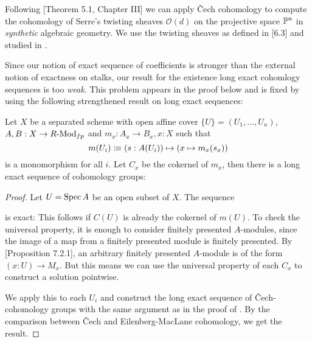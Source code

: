 
Following \cite{Hartshorne}[Theorem 5.1, Chapter III] we can apply \v{C}ech cohomology to compute
the cohomology of Serre's twisting sheaves $\mathcal O(d)$ on the projective space $\mathbb{P}^n$ in \emph{synthetic} algebraic geometry.
We use the twisting sheaves as defined in \cite{draft}[6.3] and studied in \cite{sag-projective}.

Since our notion of exact sequence of coefficients is stronger than the external notion of exactness on stalks, our result for the existence long exact cohomlogy sequences is too \emph{weak}.
This problem appears in the proof below and is fixed by using the following strengthened result on long exact sequences:

\begin{lemma}
  Let $X$ be a separated scheme with open affine cover $\{U\}=(U_1,\dots,U_n)$,
  $A,B:X\to R\text{-}\mathrm{Mod}_{fp}$ and $m_x:A_x\to B_x, x:X$ such that
  \[
    m(U_i)\vcentcolon\mspace{-1.2mu}\equiv (s:A(U_i)) \mapsto (x\mapsto m_x(s_x))
  \]
  is a monomorphism for all $i$.
  Let $C_x$ be the cokernel of $m_x$, then there is a long exact sequence of cohomology groups:
  \begin{center}
  \end{center}
\end{lemma}

\begin{proof}
  Let $U=\operatorname{Spec} A$ be an open subset of $X$.
  The sequence
  \begin{center}
   \end{center}
   is exact: This follows if $C(U)$ is already the cokernel of $m(U)$.
   To check the universal property, it is enough to consider finitely presented $A$-modules,
   since the image of a map from a finitely presented module is finitely presented.
   By \cite{draft}[Proposition 7.2.1], an arbitrary finitely presented $A$-module is of the form $(x:U)\to M_x$.
   But this means we can use the universal property of each $C_x$ to construct a solution pointwise.

   We apply this to each $U_i$ and construct the long exact sequence of \v{C}ech-cohomology groups with the same argument as in the proof of .
   By the comparison  between \v{C}ech and Eilenberg-MacLane cohomology, we get the result.
\end{proof}

